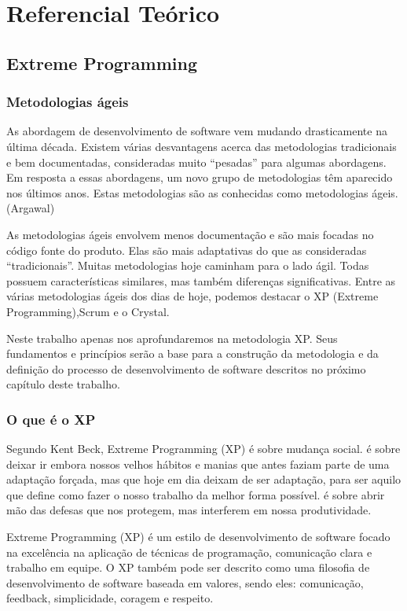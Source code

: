 \part{Referencial Teórico}

\chapter[Extreme Programming]{Extreme Programming}

\section{Metodologias ágeis}

As abordagem de desenvolvimento de software vem mudando drasticamente na última década. Existem várias desvantagens acerca das metodologias tradicionais e bem documentadas, consideradas muito “pesadas” para algumas abordagens. Em resposta a essas abordagens, um novo grupo de metodologias têm aparecido nos últimos anos. Estas metodologias são as conhecidas como metodologias ágeis. (Argawal)

As metodologias ágeis envolvem menos documentação e são mais focadas no código fonte do produto. Elas são mais adaptativas do que as consideradas “tradicionais”. Muitas metodologias hoje caminham para o lado ágil. Todas possuem características similares, mas também diferenças significativas. Entre as várias metodologias ágeis dos dias de hoje, podemos destacar o XP (Extreme Programming),Scrum e o Crystal.

Neste trabalho apenas nos aprofundaremos na metodologia XP. Seus fundamentos e princípios serão a base para a construção da metodologia e da definição do processo de desenvolvimento de software descritos no próximo capítulo deste trabalho.

\section{O que é o XP}

Segundo Kent Beck,  Extreme Programming (XP) é sobre mudança social. é sobre deixar ir embora nossos velhos hábitos e manias que antes faziam parte de uma adaptação forçada, mas que hoje em dia deixam de ser adaptação, para ser aquilo que define como fazer o nosso trabalho da melhor forma possível. é sobre abrir mão das defesas que nos protegem, mas interferem em nossa produtividade.

Extreme Programming (XP) é um estilo de desenvolvimento de software focado na excelência na aplicação de técnicas de programação, comunicação clara e trabalho em equipe. O XP também pode ser descrito como uma filosofia de desenvolvimento de software baseada em valores, sendo eles: comunicação, feedback, simplicidade, coragem e respeito.


